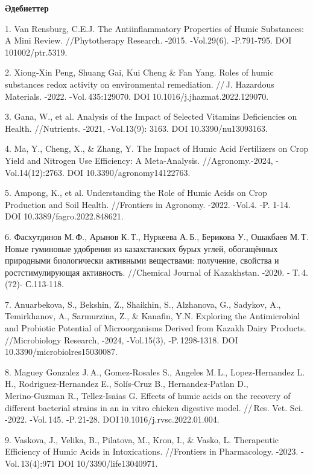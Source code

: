 \begin{center}
{\bfseries Әдебиеттер}
\end{center}

\begin{refs}
1. Van Rensburg, C.E.J. The Antiinflammatory Properties of Humic
Substances: A Mini Review. //Phytotherapy Research. -2015. -Vol.29(6).
-P.791-795. DOI 101002/ptr.5319.

2. Xiong‑Xin Peng, Shuang Gai, Kui Cheng \& Fan Yang. Roles of humic
substances redox activity on environmental remediation. //\,J. Hazardous
Materials. -2022. -Vol.\,435:129070. DOI 10.1016/j.jhazmat.2022.129070.

3. Gana, W., et al. Analysis of the Impact of Selected Vitamins
Deficiencies on Health. //Nutrients. -2021, -Vol.13(9): 3163. DOI
10.3390/nu13093163.

4. Ma, Y., Cheng, X., \& Zhang, Y. The Impact of Humic Acid Fertilizers
on Crop Yield and Nitrogen Use Efficiency: A Meta-Analysis.
//Agronomy.-2024, -Vol.14(12):2763. DOI 10.3390/agronomy14122763.

5. Ampong, K., et al. Understanding the Role of Humic Acids on Crop
Production and Soil Health. //Frontiers in Agronomy. -2022. -Vol.4. -P.
1-14. DOI 10.3389/fagro.2022.848621.

6. Фасхутдинов М.\,Ф., Арынов К.\,Т., Нуркеева А.\,Б., Берикова У.,
Ошакбаев М.\,Т. Новые гуминовые удобрения из казахстанских бурых углей,
обогащённых природными биологически активными веществами: получение,
свойства и ростстимулирующая активность. //Chemical Journal of
Kazakhstan. -2020. - Т.\,4.(72)- С.113-118.

7. Anuarbekova, S., Bekshin, Z., Shaikhin, S., Alzhanova, G., Sadykov,
A., Temirkhanov, A., Sarmurzina, Z., \& Kanafin, Y.N. Exploring the
Antimicrobial and Probiotic Potential of Microorganisms Derived from
Kazakh Dairy Products. //Microbiology Research, -2024, -Vol.15(3),
-P.\,1298-1318. DOI 10.3390/microbiolres15030087.

8. Maguey Gonzalez J.\,A., Gomez‑Rosales S., Angeles M.\,L.,
Lopez‑Hernandez L.\,H., Rodriguez‑Hernandez E., Solís‑Cruz B.,
Hernandez‑Patlan D., Merino‑Guzman R., Tellez‑Isaias G. Effects of humic
acids on the recovery of different bacterial strains in an in vitro
chicken digestive model. //\,Res. Vet. Sci. -2022. -Vol.\,145.
-P.\,21-28. DOI\,10.1016/j.rvsc.2022.01.004.

9. Vaskova, J., Velika, B., Pilatova, M., Kron, I., \& Vasko, L.
Therapeutic Efficiency of Humic Acids in Intoxications. //Frontiers in
Pharmacology. -2023. -Vol.\,13(4):971 DOI 10/3390/life13040971.


\end{refs}
